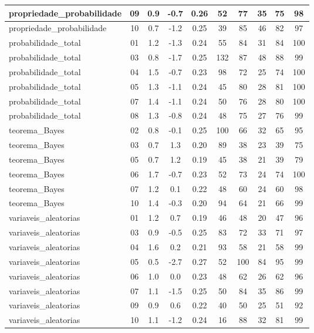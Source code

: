 \documentclass[a4paper]{report}
\begin{document}
\begin{longtable}{l|c|c|c|c|c|c|c|c|c}
\hline
propriedade\_probabilidade & 09 & 0.9 & -0.7 & 0.26 & 52 & 77 & 35 & 75 & 98\\
\hline
propriedade\_probabilidade & 10 & 0.7 & -1.2 & 0.25 & 39 & 85 & 46 & 82 & 97\\
\hline
probabilidade\_total & 01 & 1.2 & -1.3 & 0.24 & 55 & 84 & 31 & 84 & 100\\
\hline
probabilidade\_total & 03 & 0.8 & -1.7 & 0.25 & 132 & 87 & 48 & 88 & 99\\
\hline
probabilidade\_total & 04 & 1.5 & -0.7 & 0.23 & 98 & 72 & 25 & 74 & 100\\
\hline
probabilidade\_total & 05 & 1.3 & -1.1 & 0.24 & 45 & 80 & 28 & 81 & 100\\
\hline
probabilidade\_total & 07 & 1.4 & -1.1 & 0.24 & 50 & 76 & 28 & 80 & 100\\
\hline
probabilidade\_total & 08 & 1.3 & -0.8 & 0.24 & 48 & 75 & 27 & 76 & 99\\
\hline
teorema\_Bayes & 02 & 0.8 & -0.1 & 0.25 & 100 & 66 & 32 & 65 & 95\\
\hline
teorema\_Bayes & 03 & 0.7 & 1.3 & 0.20 & 89 & 38 & 23 & 39 & 75\\
\hline
teorema\_Bayes & 05 & 0.7 & 1.2 & 0.19 & 45 & 38 & 21 & 39 & 79\\
\hline
teorema\_Bayes & 06 & 1.7 & -0.7 & 0.23 & 52 & 73 & 24 & 74 & 100\\
\hline
teorema\_Bayes & 07 & 1.2 & 0.1 & 0.22 & 48 & 60 & 24 & 60 & 98\\
\hline
teorema\_Bayes & 10 & 1.4 & -0.3 & 0.20 & 94 & 64 & 21 & 66 & 99\\
\hline
variaveis\_aleatorias & 01 & 1.2 & 0.7 & 0.19 & 46 & 48 & 20 & 47 & 96\\
\hline
variaveis\_aleatorias & 03 & 0.9 & -0.5 & 0.25 & 83 & 72 & 33 & 71 & 97\\
\hline
variaveis\_aleatorias & 04 & 1.6 & 0.2 & 0.21 & 93 & 58 & 21 & 58 & 99\\
\hline
variaveis\_aleatorias & 05 & 0.5 & -2.7 & 0.27 & 52 & 100 & 84 & 95 & 99\\
\hline
variaveis\_aleatorias & 06 & 1.0 & 0.0 & 0.23 & 48 & 62 & 26 & 62 & 96\\
\hline
variaveis\_aleatorias & 07 & 1.1 & -1.5 & 0.25 & 50 & 84 & 35 & 86 & 99\\
\hline
variaveis\_aleatorias & 09 & 0.9 & 0.6 & 0.22 & 40 & 50 & 25 & 51 & 92\\
\hline
variaveis\_aleatorias & 10 & 1.1 & -1.2 & 0.24 & 16 & 88 & 32 & 81 & 99\\

\end{longtable}
\end{document}

